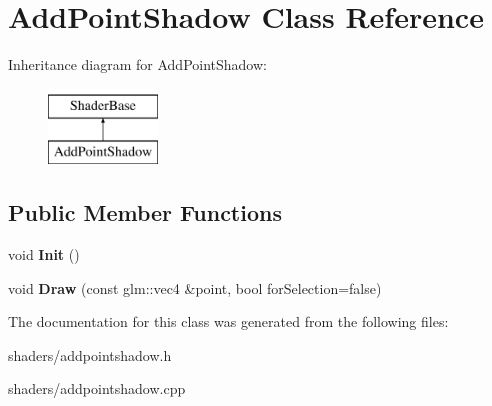 \hypertarget{classAddPointShadow}{\section{\-Add\-Point\-Shadow \-Class \-Reference}
\label{classAddPointShadow}
}
\-Inheritance diagram for \-Add\-Point\-Shadow\-:\begin{figure}[H]
\begin{center}
\leavevmode
\includegraphics[height=2.000000cm]{classAddPointShadow}
\end{center}
\end{figure}
\subsection*{\-Public \-Member \-Functions}
\begin{DoxyCompactItemize}
\item 
\hypertarget{classAddPointShadow_afbd1b6065f6cd126fa51e9911f14af24}{void {\bfseries \-Init} ()}\label{classAddPointShadow_afbd1b6065f6cd126fa51e9911f14af24}

\item 
\hypertarget{classAddPointShadow_ac087b8fa390d3c92f55cdee5f86d5de0}{void {\bfseries \-Draw} (const glm\-::vec4 \&point, bool for\-Selection=false)}\label{classAddPointShadow_ac087b8fa390d3c92f55cdee5f86d5de0}

\end{DoxyCompactItemize}


\-The documentation for this class was generated from the following files\-:\begin{DoxyCompactItemize}
\item 
shaders/addpointshadow.\-h\item 
shaders/addpointshadow.\-cpp\end{DoxyCompactItemize}
